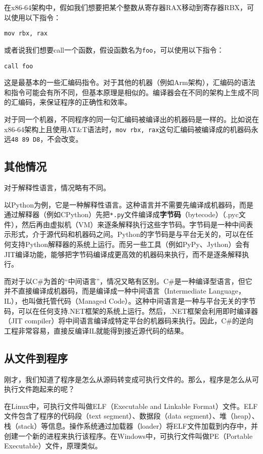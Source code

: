 在x86-64架构中，假如我们想要把某个整数从寄存器RAX移动到寄存器RBX，可以使用以下指令：
\begin{lstlisting}
mov rbx, rax
\end{lstlisting}
或者说我们想要call一个函数，假设函数名为\texttt{foo}，可以使用以下指令：
\begin{lstlisting}
call foo
\end{lstlisting}
这是最基本的一些汇编码指令。对于其他的机器（例如Arm架构），汇编码的语法和指令可能会有所不同，但基本原理是相似的。编译器会在不同的架构上生成不同的汇编码，来保证程序的正确性和效率。

对于同一个机器，不同程序的同一句汇编码被编译出的机器码是一样的。比如说在x86-64架构上且使用AT\&T语法时，\texttt{mov rbx, rax}这句汇编码被编译成的机器码永远\texttt{48 89 D8}，不会改变。

\subsection{其他情况}

对于解释性语言，情况略有不同。

以Python为例，它是一种解释性语言。这种语言并不需要先编译成机器码，而是通过解释器（例如CPython）先把\texttt{*.py}文件编译成\textbf{字节码}（bytecode）（.pyc文件），然后再由虚拟机（VM）来逐条解释执行这些字节码。字节码是一种中间表示形式，介于源代码和机器码之间。Python的字节码是与平台无关的，可以在任何支持Python解释器的系统上运行。而另一些工具（例如PyPy、Jython）会有JIT编译功能，能够把字节码编译成更高效的机器码来执行，而不是逐条解释执行。

而对于以C\#为首的“中间语言”，情况又略有区别。C\#是一种编译型语言，但它并不直接编译成机器码，而是编译成一种中间语言（Intermediate Language，IL），也叫做托管代码（Managed Code）。这种中间语言是一种与平台无关的字节码，可以在任何支持.NET框架的系统上运行。然后，.NET框架会利用即时编译器（JIT compiler）将中间语言编译成特定平台的机器码来执行。因此，C\#的逆向工程非常容易，直接反编译IL就能得到接近源代码的结果。

\subsection{从文件到程序}

刚才，我们知道了程序是怎么从源码转变成可执行文件的。那么，程序是怎么从可执行文件跑起来的呢？

在Linux中，可执行文件叫做ELF（Executable and Linkable Format）文件。ELF文件包含了程序的代码段（text segment）、数据段（data segment）、堆（heap）、栈（stack）等信息。操作系统通过加载器（loader）将ELF文件加载到内存中，并创建一个新的进程来执行该程序。在Windows中，可执行文件叫做PE（Portable Executable）文件，原理类似。

